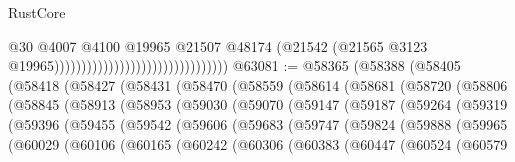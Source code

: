 \begin{lexlean}{RustCore}
\begin{coremodule}
                                                                @30
                                                                @4007
                                                                @4100
                                                                @19965
                                                                @21507
                                                                @48174
                                                                (@21542
                                                                  (@21565
                                                                    @3123
                                                                    @19965))))))))))))))))))))))))))))))))
@63081 := @58365
    (@58388
      (@58405
        (@58418
          (@58427
            (@58431
              (@58470
                (@58559
                  (@58614
                    (@58681
                      (@58720
                        (@58806
                          (@58845
                            (@58913
                              (@58953
                                (@59030
                                  (@59070
                                    (@59147
                                      (@59187
                                        (@59264
                                          (@59319
                                            (@59396
                                              (@59455
                                                (@59542
                                                  (@59606
                                                    (@59683
                                                      (@59747
                                                        (@59824
                                                          (@59888
                                                            (@59965
                                                              (@60029
                                                                (@60106
                                                                  (@60165
                                                                    (@60242
                                                                      (@60306
                                                                        (@60383
                                                                          (@60447
                                                                            (@60524
                                                                              (@60579

\end{coremodule}
\end{lexlean}
